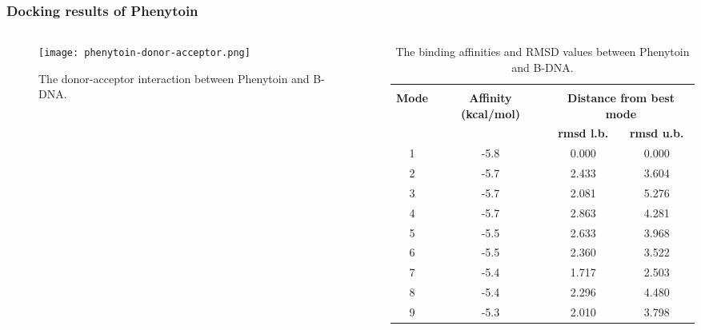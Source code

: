 \frametitle{Docking results of Phenytoin}
\begin{columns}
	\begin{column}{0.6\linewidth}
		\begin{figure}
			\texttt{[image: phenytoin-donor-acceptor.png]}
			\caption{\centering The donor-acceptor interaction \linebreak between Phenytoin and B-DNA.}
			\label{fig:pht_donor_acceptor}
		\end{figure}
	\end{column}
	\begin{column}{0.45\linewidth}
		\centering
		\scriptsize
		\begin{table}
			\begin{tabular}{*{4}{c}}
				\hline\\[-1em]
				\multirow{2}{2em}{\centering\textbf{Mode}}&\multirow{2}{4em}{\centering\textbf{Affinity (kcal/mol)}}&\multicolumn{2}{c}{\centering\textbf{Distance from best mode}}\\
				\cline{3-4}
				&&\textbf{rmsd l.b.}&\textbf{rmsd u.b.}\\
				1&-5.8&0.000&0.000\\
				2&-5.7&2.433&3.604\\
				3&-5.7&2.081&5.276\\
				4&-5.7&2.863&4.281\\
				5&-5.5&2.633&3.968\\
				6&-5.5&2.360&3.522\\
				7&-5.4&1.717&2.503\\
				8&-5.4&2.296&4.480\\
				9&-5.3&2.010&3.798\\
				\hline
			\end{tabular}
			\caption{\centering The binding affinities and RMSD values between Phenytoin and B-DNA.}
			\label{table:pht}
		\end{table}
	\end{column}
\end{columns}